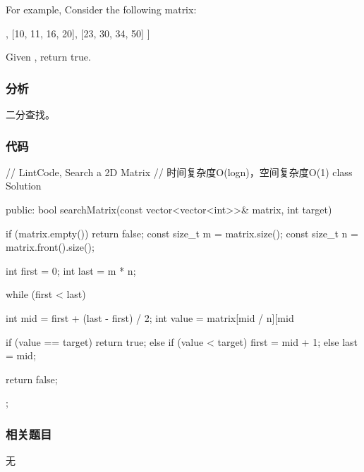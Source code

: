 For example, Consider the following matrix:
\begin{Code}
[
  [1,   3,  5,  7],
  [10, 11, 16, 20],
  [23, 30, 34, 50]
]
\end{Code}
Given , return true.


\subsubsection{分析}
二分查找。


\subsubsection{代码}
\begin{Code}
// LintCode, Search a 2D Matrix
// 时间复杂度O(logn)，空间复杂度O(1)
class Solution {
public:
    bool searchMatrix(const vector<vector<int>>& matrix, int target) {
        if (matrix.empty()) return false;
        const size_t  m = matrix.size();
        const size_t n = matrix.front().size();

        int first = 0;
        int last = m * n;

        while (first < last) {
            int mid = first + (last - first) / 2;
            int value = matrix[mid / n][mid %

            if (value == target)
                return true;
            else if (value < target)
                first = mid + 1;
            else
                last = mid;
        }

        return false;
    }
};
\end{Code}


\subsubsection{相关题目}
\begindot
\item 无
\myenddot
